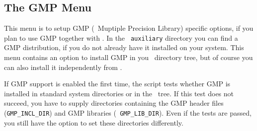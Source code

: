 
\subsection{The GMP Menu}\label{sec:gmp-menu}

This menu is to setup GMP (\gnu\ Muptiple Precision Library) specific
options, if you plan to use GMP together with \cgal . In the {\tt
  auxiliary} directory you can find a GMP distribution, if you do not
already have it installed on your system. This menu contains an option
to install GMP in you \cgal\ directory tree, but of course you can
also install it independently from \cgal .

If GMP support is enabled the first time, the script tests whether GMP
is installed in standard system directories or in the \cgal\ tree. If
this test does not succeed, you have to supply directories containing
the GMP header files (\texttt{GMP\_INCL\_DIR}) and GMP libraries ({\tt
  GMP\_LIB\_DIR}).  Even if the tests are passed, you still have the
option to set these directories differently.\bigskip

